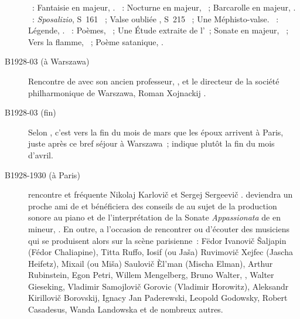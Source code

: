 \begin{description}
 \textsc{\Schumann{}}~: Fantaisie en \kC majeur, .
 \textsc{\Chopin{}}~: Nocturne en \kF majeur,  ~;
 Barcarolle en \kF \Sharp majeur, .
 \textsc{\Liszt{}}~: \emph{Sposalizio}, S~161 ~; Valse oubliée
 , S~215 ~; Une Méphisto-valse.
 \textsc{\Prokofiev{}}~: Légende,  .
 \textsc{\Scriabine{}}~: Poèmes, ~; Une Étude extraite de
 l'~; Sonate en \kF \Sharp majeur, ~; Vers la flamme,
 ~; Poème satanique, .
 \item[B1928-03 (à Warszawa)]
 Rencontre de \VSofronitsky{} avec son ancien professeur, \AMichalowski{},
 et le directeur de la société philharmonique de Warszawa, Roman Xojnackij
 \citep[voir][p.~\hbox{32-33}]{Sofronitsky82a}.
 \item[B1928-03 (fin)]
 Selon \citet[p.~148]{Nekrasova08}, c'est vers la fin du mois de mars que
 les époux \Sofronitsky{} arrivent à Paris, juste après ce bref séjour à
 Warszawa~; \citet[p.~112]{White} indique plutôt la fin du mois d'avril.
 \item[B1928-1930 (à Paris)]
 \VSofronitsky{} rencontre et fréquente Nikolaj Karlovič \Medtner{} et
 Sergej Sergeevič \Prokofiev{}.
 \Sofronitsky{} deviendra un proche ami de \Prokofiev{} et bénéficiera des
 conseils de \Medtner{} au sujet de la production sonore au piano et de
 l'interprétation de la Sonate \emph{Appassionata} de \Beethoven{} en \kF
 mineur, 
 \citep[voir \INikonovich{}, traduit en anglais par][p.~\hbox{7-9}]{White}.
 En outre, \VSofronitsky{} a l'occasion de rencontrer ou d'écouter des
 musiciens qui se produisent alors sur la scène parisienne~: Fëdor Ivanovič
 Šaljapin (Fédor Chaliapine), Titta Ruffo, Iosif (ou Jaša) Ruvimovič Xejfec
 (Jascha Heifetz), Mixail (ou Miša) Saulovič Èl'man (Mischa Elman), Arthur
 Rubinstein, Egon Petri, Willem Mengelberg, Bruno Walter, \SRachmaninov{},
 Walter Gieseking, Vladimir Samojlovič Gorovic (Vladimir Horowitz),
 Aleksandr Kirillovič Borovskij, Ignacy Jan Paderewski, Leopold Godowsky,
 Robert Casadesus, Wanda Landowska et de nombreux autres.


\end{description}
